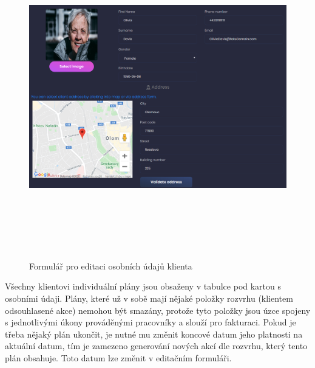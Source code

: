\documentclass[
  glossaries,
]{kidiplom}
\begin{document}
\begin{figure}[H]
  	\centering
 	 \includegraphics[width=14cm,height=14cm,keepaspectratio]{client_general_info}
 	 \caption{Formulář pro editaci osobních údajů klienta}
 	 \label{fig:clientGeneralInfo}
\end{figure}

Všechny klientovi individuální plány jsou obsaženy v tabulce pod kartou s osobními údaji. Plány, které už v sobě mají nějaké položky rozvrhu (klientem odsouhlasené akce) nemohou být smazány, protože tyto položky jsou úzce spojeny s jednotlivými úkony prováděnými pracovníky a slouží pro fakturaci. Pokud je třeba nějaký plán ukončit, je nutné mu změnit koncové datum jeho platnosti na aktuální datum, tím je zamezeno generování nových akcí dle rozvrhu, který tento plán obsahuje. Toto datum lze změnit v editačním formuláři.
\end{document}
